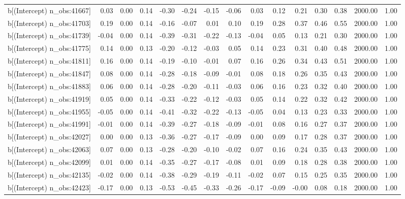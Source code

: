 \begin{table}[ht]
\begin{tabular}{rrrrrrrrrrrrrrr}
  b[(Intercept) n\_obs:41667] & 0.03 & 0.00 & 0.14 & -0.30 & -0.24 & -0.15 & -0.06 & 0.03 & 0.12 & 0.21 & 0.30 & 0.38 & 2000.00 & 1.00 \\ 
  b[(Intercept) n\_obs:41703] & 0.19 & 0.00 & 0.14 & -0.16 & -0.07 & 0.01 & 0.10 & 0.19 & 0.28 & 0.37 & 0.46 & 0.55 & 2000.00 & 1.00 \\ 
  b[(Intercept) n\_obs:41739] & -0.04 & 0.00 & 0.14 & -0.39 & -0.31 & -0.22 & -0.13 & -0.04 & 0.05 & 0.13 & 0.21 & 0.30 & 2000.00 & 1.00 \\ 
  b[(Intercept) n\_obs:41775] & 0.14 & 0.00 & 0.13 & -0.20 & -0.12 & -0.03 & 0.05 & 0.14 & 0.23 & 0.31 & 0.40 & 0.48 & 2000.00 & 1.00 \\ 
  b[(Intercept) n\_obs:41811] & 0.16 & 0.00 & 0.14 & -0.19 & -0.10 & -0.01 & 0.07 & 0.16 & 0.26 & 0.34 & 0.43 & 0.51 & 2000.00 & 1.00 \\ 
  b[(Intercept) n\_obs:41847] & 0.08 & 0.00 & 0.14 & -0.28 & -0.18 & -0.09 & -0.01 & 0.08 & 0.18 & 0.26 & 0.35 & 0.43 & 2000.00 & 1.00 \\ 
  b[(Intercept) n\_obs:41883] & 0.06 & 0.00 & 0.14 & -0.28 & -0.20 & -0.11 & -0.03 & 0.06 & 0.16 & 0.23 & 0.32 & 0.40 & 2000.00 & 1.00 \\ 
  b[(Intercept) n\_obs:41919] & 0.05 & 0.00 & 0.14 & -0.33 & -0.22 & -0.12 & -0.03 & 0.05 & 0.14 & 0.22 & 0.32 & 0.42 & 2000.00 & 1.00 \\ 
  b[(Intercept) n\_obs:41955] & -0.05 & 0.00 & 0.14 & -0.41 & -0.32 & -0.22 & -0.13 & -0.05 & 0.04 & 0.13 & 0.23 & 0.33 & 2000.00 & 1.00 \\ 
  b[(Intercept) n\_obs:41991] & -0.01 & 0.00 & 0.14 & -0.39 & -0.27 & -0.18 & -0.09 & -0.01 & 0.08 & 0.16 & 0.27 & 0.37 & 2000.00 & 1.00 \\ 
  b[(Intercept) n\_obs:42027] & 0.00 & 0.00 & 0.13 & -0.36 & -0.27 & -0.17 & -0.09 & 0.00 & 0.09 & 0.17 & 0.28 & 0.37 & 2000.00 & 1.00 \\ 
  b[(Intercept) n\_obs:42063] & 0.07 & 0.00 & 0.13 & -0.28 & -0.20 & -0.10 & -0.02 & 0.07 & 0.16 & 0.24 & 0.35 & 0.43 & 2000.00 & 1.00 \\ 
  b[(Intercept) n\_obs:42099] & 0.01 & 0.00 & 0.14 & -0.35 & -0.27 & -0.17 & -0.08 & 0.01 & 0.09 & 0.18 & 0.28 & 0.38 & 2000.00 & 1.00 \\ 
  b[(Intercept) n\_obs:42135] & -0.02 & 0.00 & 0.14 & -0.38 & -0.29 & -0.19 & -0.11 & -0.02 & 0.07 & 0.15 & 0.25 & 0.35 & 2000.00 & 1.00 \\ 
  b[(Intercept) n\_obs:42423] & -0.17 & 0.00 & 0.13 & -0.53 & -0.45 & -0.33 & -0.26 & -0.17 & -0.09 & -0.00 & 0.08 & 0.18 & 2000.00 & 1.00 \\ 

\end{tabular}
\end{table}
